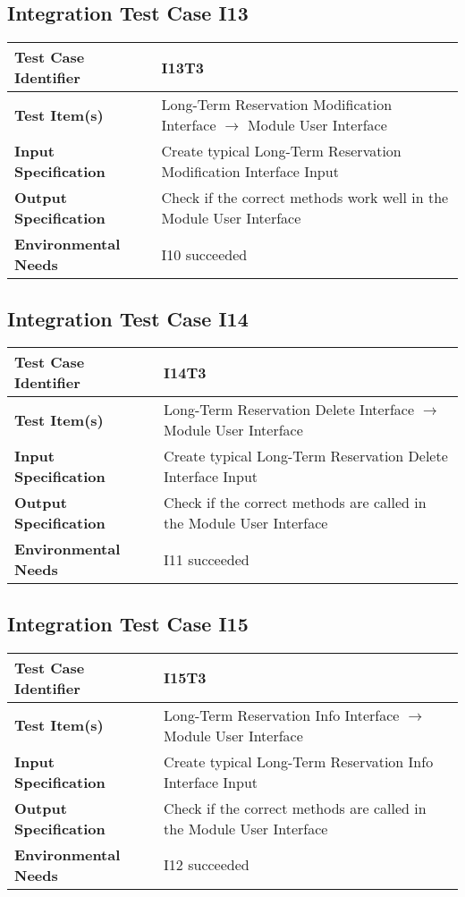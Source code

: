 \subsection{Integration Test Case I13}
\begin{tabular}{l p{9cm}}
	\hline
	\textbf{Test	Case Identifier} & I13T3 \\ \hline
	\textbf{Test	Item(s)} & Long-Term Reservation Modification Interface $\rightarrow$ Module User Interface \\ \hline
	\textbf{Input Specification} & Create typical Long-Term Reservation Modification Interface Input\\ \hline
	\textbf{Output Specification} & Check if the correct methods work well in the Module User Interface \\ \hline
	\textbf{Environmental Needs} & I10 succeeded \\ \hline
\end{tabular}
\subsection{Integration Test Case I14}
\begin{tabular}{l p{9cm}}
	\hline
	\textbf{Test	Case Identifier} & I14T3 \\ \hline
	\textbf{Test	Item(s)} & Long-Term Reservation Delete Interface $\rightarrow$ Module User Interface \\ \hline
	\textbf{Input Specification} & Create typical Long-Term Reservation Delete Interface Input\\ \hline
	\textbf{Output Specification} & Check if the correct methods are called in the Module User Interface \\ \hline
	\textbf{Environmental Needs} & I11 succeeded \\ \hline
\end{tabular}
\subsection{Integration Test Case I15}
\begin{tabular}{l p{9cm}}
	\hline
	\textbf{Test	Case Identifier} & I15T3 \\ \hline
	\textbf{Test	Item(s)} & Long-Term Reservation Info Interface $\rightarrow$ Module User Interface \\ \hline
	\textbf{Input Specification} & Create typical Long-Term Reservation Info Interface Input\\ \hline
	\textbf{Output Specification} & Check if the correct methods are called in the Module User Interface \\ \hline
	\textbf{Environmental Needs} & I12 succeeded \\ \hline
\end{tabular}

